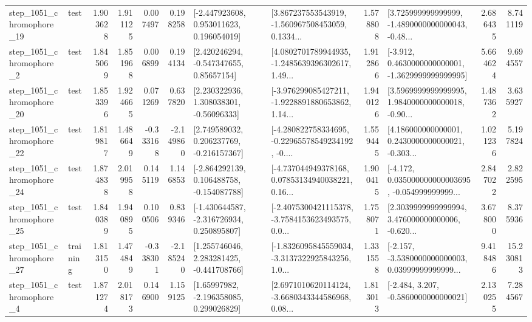 \begin{tabular}{llrrrrllrlrr}
 step\_1051\_chromophore\_19 &      test &      1.903628 &    1.911125 &      0.007497 &  0.198258 &    [-2.447923608, 0.953011623, 0.196054019] &  [3.867237553543919, -1.560967508453059, 0.1334... &       1.578808 &  [3.725999999999999, -1.4890000000000043, -0.48... &            2.686435 &          8.741119 \\
  step\_1051\_chromophore\_2 &      test &      1.845069 &    1.851968 &      0.006899 &  0.194134 &     [2.420246294, -0.547347655, 0.85657154] &  [4.0802701789944935, -1.2485639396302617, 1.49... &       1.912866 &  [-3.912, 0.4630000000000001, -1.3629999999999995] &            5.664624 &          9.694557 \\
 step\_1051\_chromophore\_20 &      test &      1.853396 &    1.924665 &      0.071269 &  0.637820 &     [2.230322936, 1.308038301, -0.56096333] &  [-3.976299085427211, -1.9228891880653862, 1.14... &       1.940126 &  [3.5969999999999995, 1.9840000000000018, -0.90... &            1.487362 &          3.635927 \\
 step\_1051\_chromophore\_22 &      test &      1.819817 &    1.486649 &     -0.333168 & -2.149860 &    [2.749589032, 0.206237769, -0.216157367] &  [-4.280822758334695, -0.22965578549234192, -0.... &       1.559445 &  [4.186000000000001, 0.2430000000000021, -0.303... &            1.021236 &          5.197824 \\
 step\_1051\_chromophore\_24 &      test &      1.874838 &    2.019958 &      0.145119 &  1.146853 &   [-2.864292139, 0.106488758, -0.154087788] &  [-4.737044949378168, 0.07853134940038221, 0.16... &       1.900415 &  [-4.172, 0.035000000000003695, -0.054999999999... &            2.847022 &          2.822595 \\
 step\_1051\_chromophore\_25 &      test &      1.840389 &    1.940895 &      0.100506 &  0.839346 &   [-1.430644587, -2.316726934, 0.250895807] &  [-2.4075300421115378, -3.7584153623493575, 0.0... &       1.758071 &  [2.3039999999999994, 3.476000000000006, -0.620... &            3.678000 &          8.375936 \\
 step\_1051\_chromophore\_27 &  training &      1.813150 &    1.474849 &     -0.338301 & -2.185240 &    [1.255746046, 2.283281425, -0.441708766] &  [-1.8326095845559034, -3.3137322925843256, 1.0... &       1.331558 &  [-2.157, -3.5380000000000003, 0.03999999999999... &            9.418486 &         15.230813 \\
  step\_1051\_chromophore\_4 &      test &      1.871274 &    2.018173 &      0.146900 &  1.159125 &     [1.65997982, -2.196358085, 0.299026829] &  [2.6971010620114124, -3.6680343344586968, 0.08... &       1.813013 &               [-2.484, 3.207, -0.5860000000000021] &            2.130255 &          7.284567 \\

\end{tabular}
